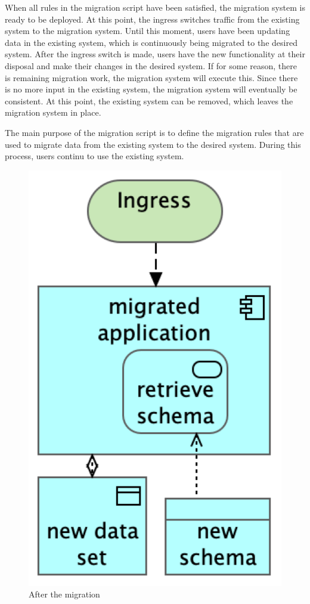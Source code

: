 \documentclass{elsarticle}
\begin{document}
   When all rules in the migration script have been satisfied, the migration system is ready to be deployed.
   At this point, the ingress switches traffic from the existing system to the migration system.
   Until this moment, users have been updating data in the existing system, which is continuously being migrated to the desired system.
   After the ingress switch is made, users have the new functionality at their disposal and make their changes in the desired system.
   If for some reason, there is remaining migration work, the migration system will execute this.
   Since there is no more input in the existing system, the migration system will eventually be consistent.
   At this point, the existing system can be removed, which leaves the migration system in place.


   The main purpose of the migration script is to define the migration rules that are used to migrate data from the existing system to the desired system.
   During this process, users continu to use the existing system.

\begin{figure}
   \centering
   \includegraphics[scale=0.1]{figures/After migration.png}
   \caption{After the migration}
   \label{fig:after}
\end{figure}
\end{document}
